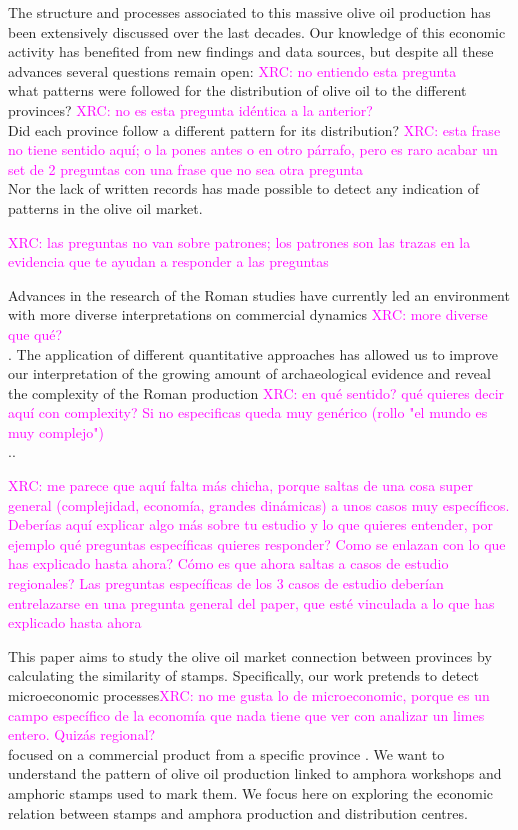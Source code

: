 \documentclass[review]{elsarticle}
\newcommand{\memo}[2]{\textcolor{#1}{#2}}
\newcommand{\xavi}[1]{\memo{magenta}{XRC: #1\\}}
\begin{document}
The structure and processes associated to this massive olive oil production has been extensively discussed over the last decades\citep{rodriguez_economioleicola_1977, Chic_hispania_1997,millet_anforas_1998}. Our knowledge of this economic activity has benefited from new findings and data sources, but despite all these advances several questions remain open: \xavi{no entiendo esta pregunta} what patterns were followed for the distribution of olive oil to the different provinces? \xavi{no es esta pregunta idéntica a la anterior?} Did each province follow a different pattern for its distribution? \xavi{esta frase no tiene sentido aquí; o la pones antes o en otro párrafo, pero es raro acabar un set de 2 preguntas con una frase que no sea otra pregunta} Nor the lack of written records has made possible to detect any indication of patterns in the olive oil market.

\xavi{las preguntas no van sobre patrones; los patrones son las trazas en la evidencia que te ayudan a responder a las preguntas}


Advances in the research of the Roman studies have currently led an environment with more diverse interpretations on commercial dynamics \citep{duncan1982economy,
temin_economy_2006,
quantifyingwilson2009}\xavi{more diverse que qué?}. The application of different quantitative approaches has allowed us to improve our interpretation of the growing amount of archaeological evidence and reveal the complexity of the Roman production \xavi{en qué sentido? qué quieres decir aquí con complexity? Si no especificas queda muy genérico (rollo "el mundo es muy complejo")}.\citep{brughmans_roman_2016,
orengo_seeds_2016,bayesian_2018,
coto-sarmiento_identifying_2018,
rubio-campillo_ecology_2018}.

\xavi{me parece que aquí falta más chicha, porque saltas de una cosa super general (complejidad, economía, grandes dinámicas) a unos casos muy específicos. Deberías aquí explicar algo más sobre tu estudio y lo que quieres entender, por ejemplo qué preguntas específicas quieres responder? Como se enlazan con lo que has explicado hasta ahora? Cómo es que ahora saltas a casos de estudio regionales? Las preguntas específicas de los 3 casos de estudio deberían entrelazarse en una pregunta general del paper, que esté vinculada a lo que has explicado hasta ahora}

This paper aims to study the olive oil market connection between provinces by calculating the similarity of stamps. Specifically, our work pretends to detect microeconomic processes\xavi{no me gusta lo de microeconomic, porque es un campo específico de la economía que nada tiene que ver con analizar un limes entero. Quizás regional?} focused on a commercial product from a specific province \citep{isaksen_network_2006}. We want to understand the pattern of olive oil production linked to amphora workshops and amphoric stamps used to mark them. We focus here on exploring the economic relation between stamps and amphora production and distribution centres. 
\end{document}
